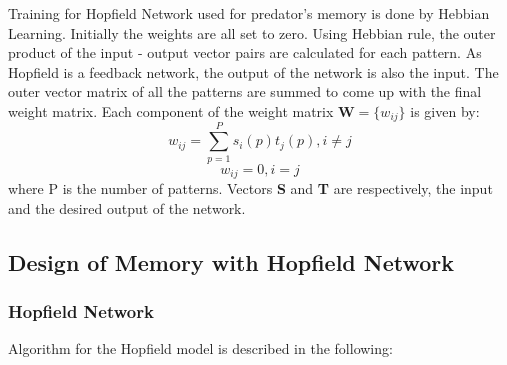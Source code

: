Training for Hopfield Network used for predator's memory is done by Hebbian Learning. Initially the weights are all set to zero. Using Hebbian rule, the outer product of the input - output vector pairs are calculated for each pattern. As Hopfield is a feedback network, the output of the network is also the input. The outer vector matrix of all the patterns are summed to come up with the final weight matrix. Each component of the weight matrix \(\textbf{W} = \{w_{ij}\}\) is given by:
\begin{equation}
w_{ij} = \sum_{p=1}^{P} s_i(p) t_j(p), i \neq j
\end{equation}
\[
w_{ij} = 0, i = j
\]
where P is the number of patterns. Vectors \textbf{S} and \textbf{T} are respectively, the input and the desired output of the network.

\subsection{Design of Memory with Hopfield Network}

\subsubsection{Hopfield Network}

Algorithm for the Hopfield model is described in the following:

